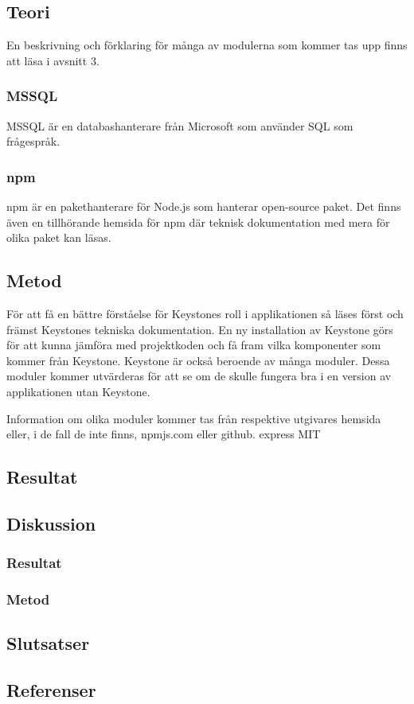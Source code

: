\subsection{Teori}
En beskrivning och förklaring för många av modulerna som kommer tas upp finns att läsa i avsnitt 3.
\subsubsection{MSSQL}
MSSQL är en databashanterare från Microsoft som använder SQL som frågespråk.

\subsubsection{npm}
npm är en pakethanterare för Node.js som hanterar open-source paket. Det finns även en tillhörande hemsida för npm där teknisk dokumentation med mera för olika paket kan läsas. 


\subsection{Metod}
För att få en bättre förståelse för Keystones roll i applikationen så läses först och främst Keystones tekniska dokumentation. En ny installation av Keystone görs för att kunna jämföra med projektkoden och få fram vilka komponenter som kommer från Keystone. Keystone är också beroende av många moduler. Dessa moduler kommer utvärderas för att se om de skulle fungera bra i en version av applikationen utan Keystone. 

Information om olika moduler kommer tas från respektive utgivares hemsida eller, i de fall de inte finns, npmjs.com eller github.
express MIT

\subsection{Resultat}
\subsection{Diskussion}
\subsubsection{Resultat}
\subsubsection{Metod}
\subsection{Slutsatser}
\subsection{Referenser}
\vspace{-9mm}
\begin{thebibliography}{9}

\end{thebibliography}
